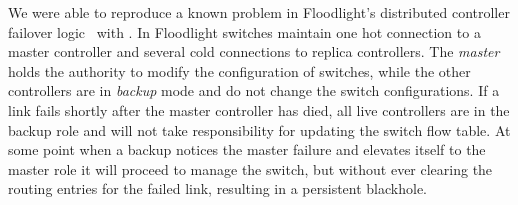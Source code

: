   We were able to reproduce a
known problem in Floodlight's distributed controller failover logic~\cite{floodlight_bug} with
\projectname. In Floodlight switches maintain one hot connection to a master controller and
several cold connections to replica controllers. The \emph{master} holds the
authority to modify the configuration of switches, while the other
controllers are in \emph{backup} mode and do not change the
switch configurations. %
If a link fails shortly after the master
controller has died, all live controllers are in
the backup role and will not take responsibility for updating the switch
flow table. At some point when a backup notices the master failure and
elevates itself to the master role it will proceed to manage
the switch, but without ever clearing the routing entries for
the failed link, resulting in a persistent blackhole.

